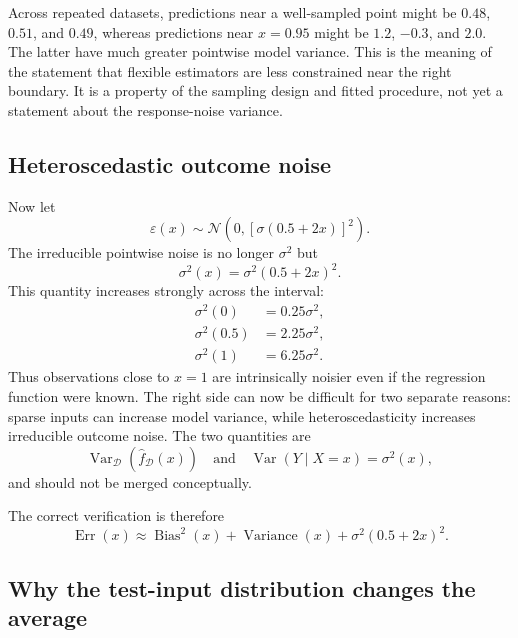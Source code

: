 \documentclass[11pt,a4paper]{article}
\newcommand{\VarD}{\operatorname{Var}_{\mathcal D}}
\begin{document}
Across repeated datasets, predictions near a well-sampled point might be $0.48$, $0.51$, and $0.49$, whereas predictions near $x=0.95$ might be $1.2$, $-0.3$, and $2.0$. The latter have much greater pointwise model variance. This is the meaning of the statement that flexible estimators are less constrained near the right boundary. It is a property of the sampling design and fitted procedure, not yet a statement about the response-noise variance.

\subsection{Heteroscedastic outcome noise}

Now let
\begin{equation}
  \varepsilon(x)\sim\mathcal N\left(0,
  \left[\sigma(0.5+2x)\right]^2\right).
\end{equation}
The irreducible pointwise noise is no longer $\sigma^2$ but
\begin{equation}
  \boxed{\sigma^2(x)=\sigma^2(0.5+2x)^2.}
\end{equation}
This quantity increases strongly across the interval:
\begin{align*}
  \sigma^2(0)&=0.25\sigma^2,\\
  \sigma^2(0.5)&=2.25\sigma^2,\\
  \sigma^2(1)&=6.25\sigma^2.
\end{align*}
Thus observations close to $x=1$ are intrinsically noisier even if the regression function were known. The right side can now be difficult for two separate reasons: sparse inputs can increase model variance, while heteroscedasticity increases irreducible outcome noise. The two quantities are
\begin{equation*}
  \VarD(\widehat f_{\mathcal D}(x))
  \quad\text{and}\quad
  \operatorname{Var}(Y\mid X=x)=\sigma^2(x),
\end{equation*}
and should not be merged conceptually.

The correct verification is therefore
\begin{equation}
  \operatorname{Err}(x)
  \approx \operatorname{Bias}^2(x)
  +\operatorname{Variance}(x)
  +\sigma^2(0.5+2x)^2.
\end{equation}
\subsection{Why the test-input distribution changes the average}
\end{document}
